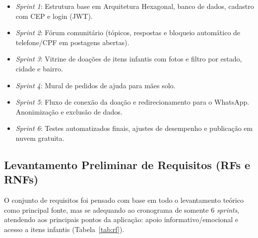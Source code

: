 \begin{itemize}
    \item \textit{Sprint 1}: Estrutura base em Arquitetura Hexagonal, banco de dados, cadastro com CEP e login (JWT).
    \item \textit{Sprint 2}: Fórum comunitário (tópicos, respostas e bloqueio automático de telefone/CPF em postagens abertas).
    \item \textit{Sprint 3}: Vitrine de doações de itens infantis com fotos e filtro por estado, cidade e bairro.
    \item \textit{Sprint 4}: Mural de pedidos de ajuda para mães solo.
    \item \textit{Sprint 5}: Fluxo de conexão da doação e redirecionamento para o WhatsApp. Anonimização e exclusão de dados.
    \item \textit{Sprint 6}: Testes automatizados finais, ajustes de desempenho e publicação em nuvem gratuita.
\end{itemize}

\subsection{Levantamento Preliminar de Requisitos (RFs e RNFs)}
O conjunto de requisitos foi pensado com base em todo o levantamento teórico como principal fonte, mas se adequando ao cronograma de somente 6 \textit{sprints}, atendendo aos principais pontos da aplicação: apoio informativo/emocional e acesso a itens infantis (Tabela~\ref{tab:rf}).

